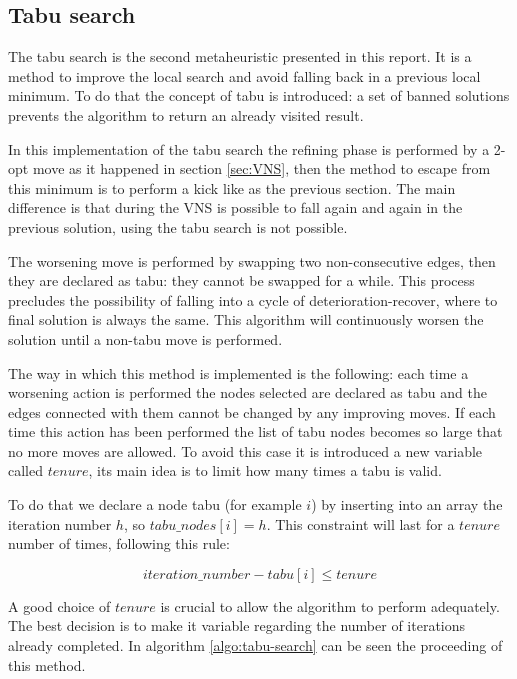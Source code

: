 \subsection{Tabu search}
\label{sec:tabu-search}
The tabu search is the second metaheuristic presented in this report. It is a method to improve the local search and avoid falling back in a previous local minimum. To do that the concept of tabu is introduced: a set of banned solutions prevents the algorithm to return an already visited result.

In this implementation of the tabu search the refining phase is performed by a 2-opt move as it happened in section \ref{sec:VNS}, then the method to escape from this minimum is to perform a kick like as the previous section. The main difference is that during the VNS is possible to fall again and again in the previous solution, using the tabu search is not possible. 

The worsening move is performed by swapping two non-consecutive edges, then they are declared as tabu: they cannot be swapped for a while. This process precludes the possibility of falling into a cycle of deterioration-recover, where to final solution is always the same. This algorithm will continuously worsen the solution until a non-tabu move is performed.

The way in which this method is implemented is the following: each time a worsening action is performed the nodes selected are declared as tabu and the edges connected with them cannot be changed by any improving moves. If each time this action has been performed the list of tabu nodes becomes so large that no more moves are allowed. To avoid this case it is introduced a new variable called $tenure$, its main idea is to limit how many times a tabu is valid.

To do that we declare a node tabu (for example $i$) by inserting into an array the iteration number $h$, so $tabu\_nodes[i] = h$. This constraint will last for a $tenure$ number of times, following this rule:

\begin{equation}
	iteration\_number - tabu[i] \le tenure
\end{equation}

A good choice of $tenure$ is crucial to allow the algorithm to perform adequately. The best decision is to make it variable regarding the number of iterations already completed. In algorithm \ref{algo:tabu-search} can be seen the proceeding of this method.

